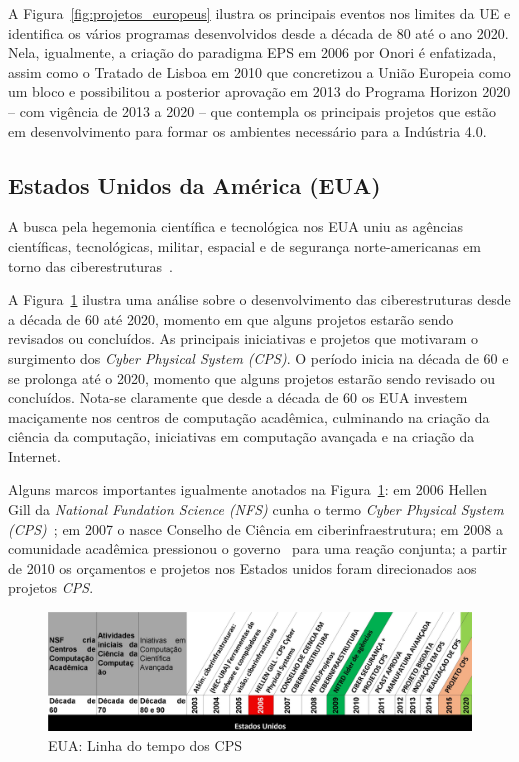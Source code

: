 
A Figura~\ref{fig:projetos_europeus} ilustra os principais eventos nos limites da UE e identifica os vários programas desenvolvidos desde a década de 80 até o ano 2020. Nela, igualmente, a criação do paradigma EPS em 2006 por Onori é enfatizada, assim como o Tratado de Lisboa em 2010 que concretizou a União Europeia como um bloco e possibilitou a posterior aprovação em 2013 do Programa Horizon 2020 -- com vigência de 2013 a 2020 -- que contempla os principais projetos que estão em desenvolvimento para formar os ambientes necessário para a Indústria 4.0.




\subsection{Estados Unidos da América (EUA)}

A busca pela hegemonia científica e tecnológica nos EUA uniu as agências científicas, tecnológicas, militar, espacial e de segurança norte-americanas em torno das ciberestruturas~\cite{NITRDGROUPS2003}.

A Figura~\ref{F2} ilustra uma análise sobre o desenvolvimento das ciberestruturas desde a década de 60 até 2020, momento em que alguns projetos estarão sendo revisados ou concluídos. As principais iniciativas e projetos que motivaram o surgimento dos \textit{Cyber Physical System (CPS)}. O período inicia na década de 60 e se prolonga até o 2020, momento que alguns projetos estarão sendo revisado ou concluídos. Nota-se claramente que desde a década de 60 os EUA investem maciçamente nos centros de computação acadêmica, culminando na criação da ciência da computação, iniciativas em computação avançada e na criação da Internet.

Alguns marcos importantes igualmente anotados na Figura~\ref{F2}: em 2006 Hellen Gill da \textit{National Fundation Science (NFS)} cunha o termo \textit{Cyber Physical System (CPS)}~\cite{GILL2005}; em 2007 o nasce Conselho de Ciência em ciberinfraestrutura; em 2008 a comunidade acadêmica pressionou o governo~\cite{LEE2008} para uma reação conjunta; a partir de 2010 os orçamentos e projetos nos Estados unidos foram direcionados aos projetos \textit{CPS}.

\begin{figure}[h]
	\centering
	\includegraphics[width=\textwidth]{img/F2_MeDSE_USA1.jpg} 
	\caption{EUA: Linha do tempo dos CPS}
	\label{F2}
\end{figure}


